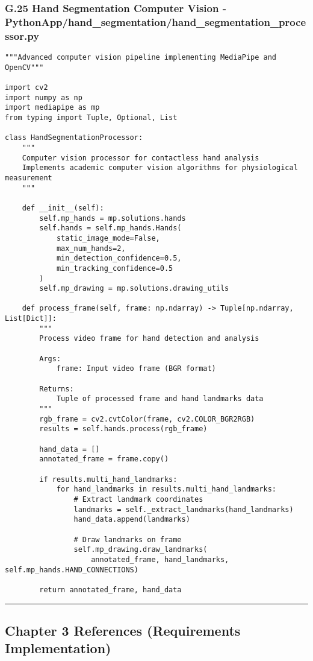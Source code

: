 \documentclass[11pt,a4paper]{article}
\begin{document}
\subsubsection{G.25 Hand Segmentation Computer Vision - PythonApp/hand_segmentation/hand_segmentation_processor.py}

\begin{verbatim}
"""Advanced computer vision pipeline implementing MediaPipe and OpenCV"""

import cv2
import numpy as np
import mediapipe as mp
from typing import Tuple, Optional, List

class HandSegmentationProcessor:
    """
    Computer vision processor for contactless hand analysis
    Implements academic computer vision algorithms for physiological measurement
    """

    def __init__(self):
        self.mp_hands = mp.solutions.hands
        self.hands = self.mp_hands.Hands(
            static_image_mode=False,
            max_num_hands=2,
            min_detection_confidence=0.5,
            min_tracking_confidence=0.5
        )
        self.mp_drawing = mp.solutions.drawing_utils

    def process_frame(self, frame: np.ndarray) -> Tuple[np.ndarray, List[Dict]]:
        """
        Process video frame for hand detection and analysis

        Args:
            frame: Input video frame (BGR format)

        Returns:
            Tuple of processed frame and hand landmarks data
        """
        rgb_frame = cv2.cvtColor(frame, cv2.COLOR_BGR2RGB)
        results = self.hands.process(rgb_frame)

        hand_data = []
        annotated_frame = frame.copy()

        if results.multi_hand_landmarks:
            for hand_landmarks in results.multi_hand_landmarks:
                # Extract landmark coordinates
                landmarks = self._extract_landmarks(hand_landmarks)
                hand_data.append(landmarks)

                # Draw landmarks on frame
                self.mp_drawing.draw_landmarks(
                    annotated_frame, hand_landmarks, self.mp_hands.HAND_CONNECTIONS)

        return annotated_frame, hand_data
\end{verbatim}

\hrule

\subsection{Chapter 3 References (Requirements Implementation)}
\end{document}
